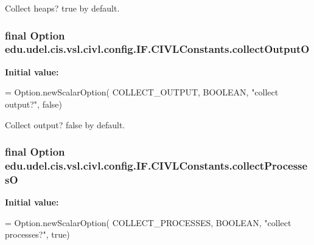 Collect heaps? true by default. 

\hypertarget{classedu_1_1udel_1_1cis_1_1vsl_1_1civl_1_1config_1_1IF_1_1CIVLConstants_ac1153b953c2aa2a7eac2c655ac5b5161}{}
\subsubsection[{collect\+Output\+O}]{\setlength{\rightskip}{0pt plus 5cm}final Option edu.\+udel.\+cis.\+vsl.\+civl.\+config.\+I\+F.\+C\+I\+V\+L\+Constants.\+collect\+Output\+O\hspace{0.3cm}{\ttfamily [static]}}\label{classedu_1_1udel_1_1cis_1_1vsl_1_1civl_1_1config_1_1IF_1_1CIVLConstants_ac1153b953c2aa2a7eac2c655ac5b5161}
{\bfseries Initial value\+:}
\begin{DoxyCode}
= Option.newScalarOption(
            COLLECT\_OUTPUT, BOOLEAN, \textcolor{stringliteral}{"collect output?"}, \textcolor{keyword}{false})
\end{DoxyCode}


Collect output? false by default. 

\hypertarget{classedu_1_1udel_1_1cis_1_1vsl_1_1civl_1_1config_1_1IF_1_1CIVLConstants_a5cb8ebefe5ae7d1fabde032089d9df21}{}
\subsubsection[{collect\+Processes\+O}]{\setlength{\rightskip}{0pt plus 5cm}final Option edu.\+udel.\+cis.\+vsl.\+civl.\+config.\+I\+F.\+C\+I\+V\+L\+Constants.\+collect\+Processes\+O\hspace{0.3cm}{\ttfamily [static]}}\label{classedu_1_1udel_1_1cis_1_1vsl_1_1civl_1_1config_1_1IF_1_1CIVLConstants_a5cb8ebefe5ae7d1fabde032089d9df21}
{\bfseries Initial value\+:}
\begin{DoxyCode}
= Option.newScalarOption(
            COLLECT\_PROCESSES, BOOLEAN, \textcolor{stringliteral}{"collect processes?"}, \textcolor{keyword}{true})
\end{DoxyCode}


